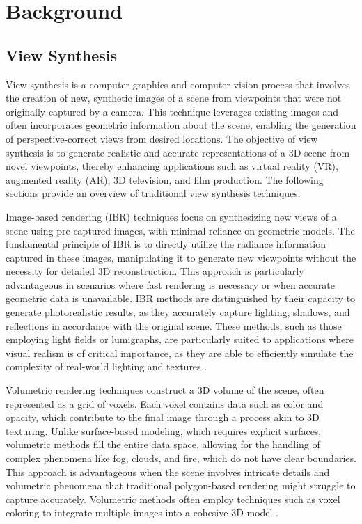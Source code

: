 %
\chapter{Background}
\label{sec:background}

\section{View Synthesis}

View synthesis is a computer graphics and computer vision process that involves the creation of new, synthetic images of a scene from viewpoints that were not originally captured by a camera. This technique leverages existing images and often incorporates geometric information about the scene, enabling the generation of perspective-correct views from desired locations.
The objective of view synthesis is to generate realistic and accurate representations of a 3D scene from novel viewpoints, thereby enhancing applications such as virtual reality (VR), augmented reality (AR), 3D television, and film production. The following sections provide an overview of traditional view synthesis techniques.

Image-based rendering (IBR) techniques focus on synthesizing new views of a scene using pre-captured images, with minimal reliance on geometric models.
The fundamental principle of IBR is to directly utilize the radiance information captured in these images, manipulating it to generate new viewpoints without the necessity for detailed 3D reconstruction.
This approach is particularly advantageous in scenarios where fast rendering is necessary or when accurate geometric data is unavailable.
IBR methods are distinguished by their capacity to generate photorealistic results, as they accurately capture lighting, shadows, and reflections in accordance with the original scene.
These methods, such as those employing light fields or lumigraphs, are particularly suited to applications where visual realism is of critical importance, as they are able to efficiently simulate the complexity of real-world lighting and textures \cite{buehler_unstructured_2001,chen_view_1993,debevec_modeling_1996,gortler_lumigraph_1996,levoy_light_1996}.

Volumetric rendering techniques construct a 3D volume of the scene, often represented as a grid of voxels. Each voxel contains data such as color and opacity, which contribute to the final image through a process akin to 3D texturing. Unlike surface-based modeling, which requires explicit surfaces, volumetric methods fill the entire data space, allowing for the handling of complex phenomena like fog, clouds, and fire, which do not have clear boundaries.
This approach is advantageous when the scene involves intricate details and volumetric phenomena that traditional polygon-based rendering might struggle to capture accurately. Volumetric methods often employ techniques such as voxel coloring to integrate multiple images into a cohesive 3D model \cite{curless_volumetric_1996,seitz_photorealistic_1999}.

